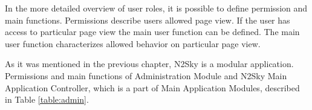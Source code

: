 In the more detailed overview of user roles, it is possible to define permission and main functions.
Permissions describe users allowed page view. If the user has access to particular page view the main user function can be defined. 
The main user function characterizes allowed behavior on particular page view. 

As it was mentioned in the previous chapter,  N2Sky is a modular application. Permissions and main functions of Administration Module and N2Sky Main Application Controller, which is a part of Main Application Modules, described in Table \ref{table:admin}.

\begin{table}[]
\caption{User Roles main functions considering "Administration Module" and "N2Sky Main Application Controller". 
"+" for allowed, "-" for disallowed}
\label{table:admin}
\end{table}

